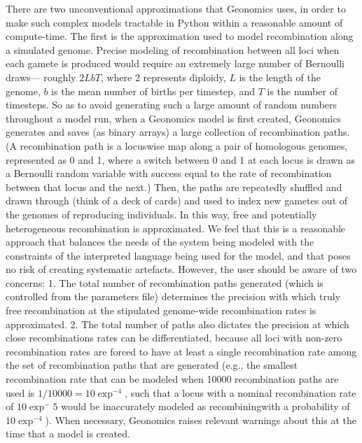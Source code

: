 ﻿\documentclass{article}
\begin{document}
There are two unconventional approximations that Geonomics uses,
in order to make such complex models tractable in Python within a reasonable amount of compute-time.
The first is the approximation used to model recombination along a simulated genome.
Precise modeling of recombination between all loci when each gamete is produced
would require an extremely large number of Bernoulli draws---
roughly $2LbT$, where $2$ represents diploidy, $L$ is the length of the genome,
$b$ is the mean number of births per timestep, and $T$ is the number of timesteps.
So as to avoid generating such a large amount of random numbers throughout a model run,
when a Geonomics model is first created, Geonomics generates and saves
(as binary arrays) a large collection of recombination paths.
(A recombination path is a locuswise map along a pair of homologous genomes,
represented as 0 and 1, where a switch between 0 and 1 at each locus is drawn as a Bernoulli
random variable with success equal to the rate of recombination between that locus and the next.)
Then, the paths are repeatedly shuffled and drawn through (think of a deck of cards)
and used to index new gametes out of the genomes of reproducing individuals.
In this way, free and potentially heterogeneous recombination is approximated.
We feel that this is a reasonable approach that balances the needs of the system being modeled
with the constraints of the interpreted language being used for the model,
and that poses no risk of creating systematic artefacts.
However, the user should be aware of two concerns:
1. The total number of recombination paths generated
(which is controlled from the parameters file) determines the precision with which truly 
free recombination at the stipulated genome-wide recombination rates is approximated.
2. The total number of paths also dictates the precision at which close recombinations
rates can be differentiated, because all loci with non-zero recombination rates are forced to
have at least a single recombination rate among the set of recombination paths that are generated
(e.g., the smallest recombination rate that can be modeled when 10000 recombination paths
are used is $1/10000=10\exp^{-4}$, such that a locus with a nominal recombination rate of 
$10\exp^-5$ would be inaccurately modeled as recombiningwith a probability of $10\exp^{-4}$). 
When necessary, Geonomics raises relevant warnings about this at the time that a model is created.
\end{document}
